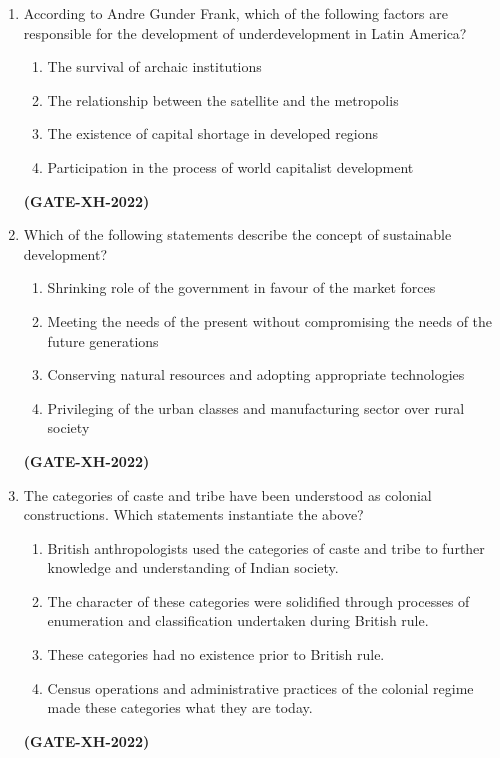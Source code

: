 \documentclass[journal]{IEEEtran}
\begin{document}
\begin{enumerate}
\item
According to Andre Gunder Frank, which of the following factors are responsible for the development of underdevelopment in Latin America?
\begin{enumerate}
\item The survival of archaic institutions
\item The relationship between the satellite and the metropolis
\item The existence of capital shortage in developed regions
\item Participation in the process of world capitalist development
\end{enumerate}
\hfill\textbf{(GATE-XH-2022)}

\item
Which of the following statements describe the concept of sustainable development?
\begin{enumerate}
\item Shrinking role of the government in favour of the market forces
\item Meeting the needs of the present without compromising the needs of the future generations
\item Conserving natural resources and adopting appropriate technologies
\item Privileging of the urban classes and manufacturing sector over rural society
\end{enumerate}
\hfill\textbf{(GATE-XH-2022)}

\item
The categories of caste and tribe have been understood as colonial constructions. Which statements instantiate the above?
\begin{enumerate}
\item British anthropologists used the categories of caste and tribe to further knowledge and understanding of Indian society.
\item The character of these categories were solidified through processes of enumeration and classification undertaken during British rule.
\item These categories had no existence prior to British rule.
\item Census operations and administrative practices of the colonial regime made these categories what they are today.
\end{enumerate}
\hfill\textbf{(GATE-XH-2022)}


\end{enumerate}
\end{document}
